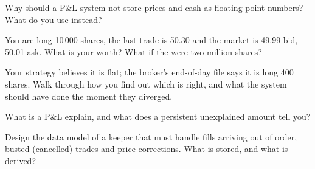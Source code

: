 \begin{interviewq}\label{iq:m1:pnl-and-positions:2}
Why should a P\&L system not store prices and cash as floating-point numbers?
What do you use instead?
\end{interviewq}

\begin{interviewq}\label{iq:m1:pnl-and-positions:3}
You are long 10\,000 shares, the last trade is 50.30 and the market is 49.99
bid, 50.01 ask. What is your  worth? What if the  were two
million shares?
\end{interviewq}

\begin{interviewq}\label{iq:m1:pnl-and-positions:4}
Your strategy believes it is flat; the broker's end-of-day file says it is
long 400 shares. Walk through how you find out which is right, and what the
system should have done the moment they diverged.
\end{interviewq}

\begin{interviewq}\label{iq:m1:pnl-and-positions:5}
What is a P\&L explain, and what does a persistent unexplained amount tell
you?
\end{interviewq}

\begin{interviewq}\label{iq:m1:pnl-and-positions:6}
Design the data model of a  keeper that must handle fills arriving
out of order, busted (cancelled) trades and price corrections. What is
stored, and what is derived?
\end{interviewq}
